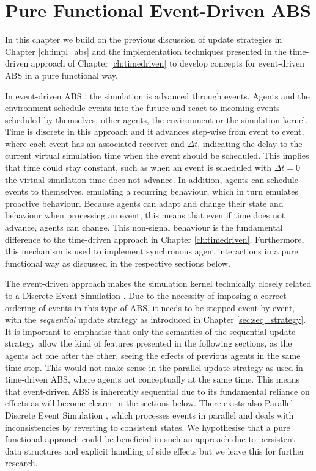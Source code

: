 \chapter{Pure Functional Event-Driven ABS}
\label{ch:eventdriven}
In this chapter we build on the previous discussion of update strategies in Chapter \ref{ch:impl_abs} and the implementation techniques presented in the time-driven approach of Chapter \ref{ch:timedriven} to develop concepts for event-driven ABS in a pure functional way. 

\medskip

In event-driven ABS \cite{meyer_event-driven_2014}, the simulation is advanced through events. Agents and the environment schedule events into the future and react to incoming events scheduled by themselves, other agents, the environment or the simulation kernel. Time is discrete in this approach and it advances step-wise from event to event, where each event has an associated receiver and $\Delta t$, indicating the delay to the current virtual simulation time when the event should be scheduled. This implies that time could stay constant, such as when an event is scheduled with $\Delta t = 0$ the virtual simulation time does not advance. In addition, agents can schedule events to themselves, emulating a recurring behaviour, which in turn emulates proactive behaviour. Because agents can adapt and change their state and behaviour when processing an event, this means that even if time does not advance, agents can change. This non-signal behaviour is the fundamental difference to the time-driven approach in Chapter \ref{ch:timedriven}. Furthermore, this mechanism is used to implement synchronous agent interactions in a pure functional way as discussed in the respective sections below.

The event-driven approach makes the simulation kernel technically closely related to a Discrete Event Simulation \cite{zeigler_theory_2000}. Due to the necessity of imposing a correct ordering of events in this type of ABS, it needs to be stepped event by event, with the \textit{sequential} update strategy as introduced in Chapter \ref{sec:seq_strategy}. It is important to emphasise that only the semantics of the sequential update strategy allow the kind of features  presented in the following sections, as the agents act one after the other, seeing the effects of previous agents in the same time step. This would not make sense in the parallel update strategy as used in time-driven ABS, where agents act conceptually at the same time. This means that event-driven ABS is inherently sequential due to its fundamental reliance on effects as will become clearer in the sections below. There exists also Parallel Discrete Event Simulation \cite{fujimoto_parallel_1990}, which processes events in parallel and deals with inconsistencies by reverting to consistent states. We hypothesise that a pure functional approach could be beneficial in such an approach due to persistent data structures and explicit handling of side effects but we leave this for further research.

